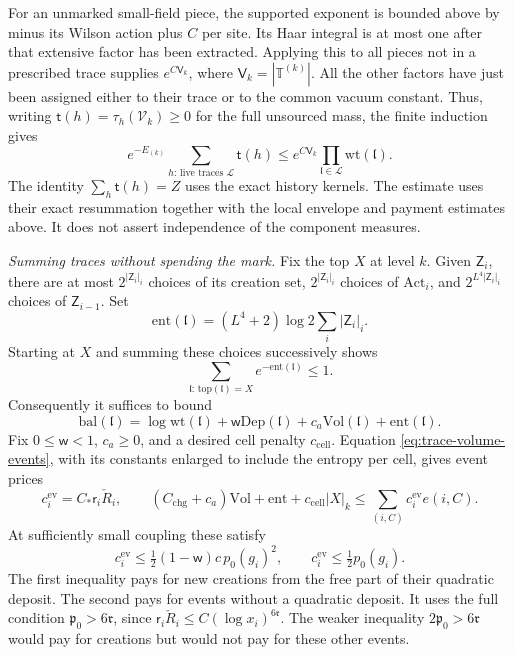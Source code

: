 \documentclass[11pt,letterpaper,reqno]{amsart}
\theoremstyle{definition}
\theoremstyle{remark}
\begin{document}
For an unmarked small-field piece, the supported exponent
is bounded above by minus its Wilson action plus \(C\) per
site. Its Haar integral is at most one after that extensive
factor has been extracted. Applying this to all pieces not
in a prescribed trace supplies \(e^{C \mathsf V_k}\), where
\(\mathsf V_k=|\mathbb T^{(k)}|\). All the other factors have just
been assigned either to their trace or to the common vacuum
constant. Thus, writing
\(\mathsf t(h)=\tau_h(\mathcal V_k)\ge0\) for the full
unsourced mass, the finite induction gives
\begin{equation}\label{eq:history-trace-mass}
 e^{-E_{(k)}}\sum_{h:\,\text{live traces }\mathcal L}
                  \mathsf t(h)
 \le e^{C \mathsf V_k}\prod_{\mathfrak l\in\mathcal L}
                                      \mathrm{wt}(\mathfrak l).
\end{equation}
The identity \(\sum_h\mathsf t(h)=Z\) uses the exact history
kernels. The estimate uses their exact resummation together
with the local envelope and payment estimates above. It
does not assert independence of the component measures.

\emph{Summing traces without spending the mark.}
Fix the top \(X\) at level \(k\). Given \(\mathsf Z_i\),
there are at most \(2^{|\mathsf Z_i|_i}\) choices of its
creation set, \(2^{|\mathsf Z_i|_i}\) choices of
\(\mathrm{Act}_i\), and
\(2^{L^4|\mathsf Z_i|_i}\) choices of
\(\mathsf Z_{i-1}\). Set
\[
 \mathrm{ent}(\mathfrak l)
       =(L^4+2)\log2\sum_i|\mathsf Z_i|_i.
\]
Starting at \(X\) and summing these choices successively
shows
\[
 \sum_{\mathfrak l:\,\mathrm{top}(\mathfrak l)=X}
                          e^{-\mathrm{ent}(\mathfrak l)}
 \le1.
\]
Consequently it suffices to bound
\[
 \mathrm{bal}(\mathfrak l)=
       \log\mathrm{wt}(\mathfrak l)
       +\mathsf w\mathrm{Dep}(\mathfrak l)
       +c_a\mathrm{Vol}(\mathfrak l)
       +\mathrm{ent}(\mathfrak l).
\]
Fix \(0\le\mathsf w<1\), \(c_a\ge0\), and a desired cell
penalty \(c_{\mathrm{cell}}\). Equation
\eqref{eq:trace-volume-events}, with its constants enlarged
to include the entropy per cell, gives event prices
\[
 c_i^{\mathrm{ev}}=C_*\mathsf r_i\check R_i,\qquad
 (C_{\mathrm{chg}}+c_a)\mathrm{Vol}
       +\mathrm{ent}+c_{\mathrm{cell}}|X|_k
 \le\sum_{(i,C)}c_i^{\mathrm{ev}}e(i,C).
\]
At sufficiently small coupling these satisfy
\begin{equation}\label{eq:trace-event-prices}
 c_i^{\mathrm{ev}}\le
       \tfrac12(1-\mathsf w)c\,p_0(g_i)^2,
 \qquad
 c_i^{\mathrm{ev}}\le\tfrac12p_0(g_i).
\end{equation}
The first inequality pays for new creations from the free
part of their quadratic deposit. The second pays for events
without a quadratic deposit. It uses the full condition
\(\mathfrak p_0>6\mathfrak r\), since
\(\mathsf r_i\check R_i\le C(\log x_i)^{6\mathfrak r}\).
The weaker inequality
\(2\mathfrak p_0>6\mathfrak r\) would pay for creations
but would not pay for these other events.
\end{document}
